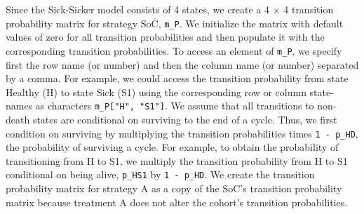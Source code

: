 \documentclass[
]{article}
\begin{document}
Since the Sick-Sicker model consists of 4 states, we create a 4 \(\times\) 4 transition probability matrix for strategy SoC, \texttt{m\_P}. We initialize the matrix with default values of zero for all transition probabilities and then populate it with the corresponding transition probabilities. To access an element of \texttt{m\_P}, we specify first the row name (or number) and then the column name (or number) separated by a comma. For example, we could access the transition probability from state Healthy (H) to state Sick (S1) using the corresponding row or column state-names as characters \texttt{m\_P{[}"H",\ "S1"{]}}. We assume that all transitions to non-death states are conditional on surviving to the end of a cycle. Thus, we first condition on surviving by multiplying the transition probabilities times \texttt{1\ -\ p\_HD}, the probability of surviving a cycle. For example, to obtain the probability of transitioning from H to S1, we multiply the transition probability from H to S1 conditional on being alive, \texttt{p\_HS1} by \texttt{1\ -\ p\_HD}. We create the transition probability matrix for strategy A as a copy of the SoC's transition probability matrix because treatment A does not alter the cohort's transition probabilities.
\end{document}
